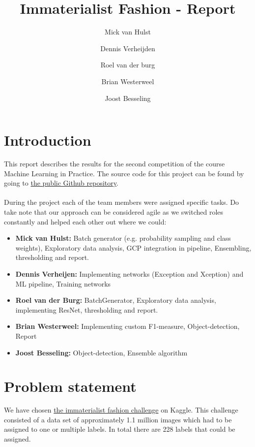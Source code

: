 \documentclass[10pt, a4paper]{article}
\title{Immaterialist Fashion - Report}
\author{Mick van Hulst \and Dennis Verheijden \and Roel van der burg \and Brian Westerweel \and Joost Besseling}
\begin{document}
	\maketitle
	
	\begin{multicols}{2}
	
	    \section{Introduction}
	    This report describes the results for the second competition of the course Machine Learning in Practice. The source code for this project can be found by going to \href{https://github.com/mickvanhulst/imaterialist_kaggle}{the public Github repository}.
	    \\
	    \\
	    During the project each of the team members were assigned specific tasks. Do take note that our approach can be considered agile as we switched roles constantly and helped each other out where we could:
	    \begin{itemize}
	        \item \textbf{Mick van Hulst:} Batch generator (e.g. probability sampling and class weights), Exploratory data analysis, GCP integration in pipeline, Ensembling, thresholding and report.
	        \item \textbf{Dennis Verheijen:} Implementing networks (Exception and Xception)  and ML pipeline, Training networks 
	        \item \textbf{Roel van der Burg:} BatchGenerator, Exploratory data analysis, implementing ResNet, thresholding and report.
	        \item \textbf{Brian Westerweel:} Implementing custom F1-measure, Object-detection, Report
	        \item \textbf{Joost Besseling:} Object-detection, Ensemble algorithm
	    \end{itemize}
		
		\section{Problem statement}
		We have chosen \href{https://www.kaggle.com/c/imaterialist-challenge-fashion-2018}{the immaterialist fashion challenge} on Kaggle. This challenge consisted of a data set of approximately 1.1 million images which had to be assigned to one or multiple labels. In total there are 228 labels that could be assigned.
		

\end{multicols}
\end{document}
